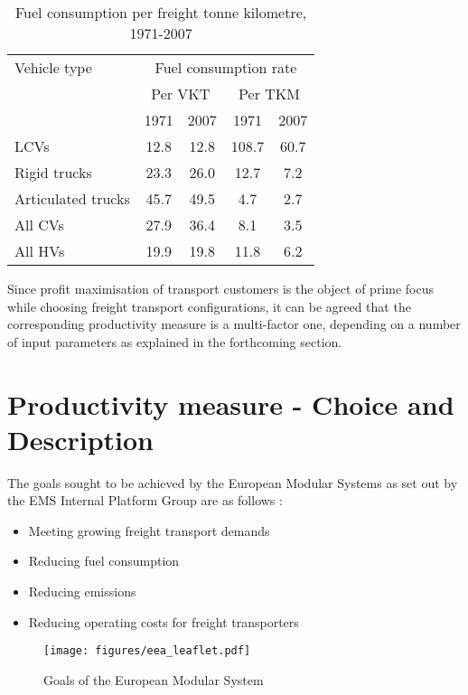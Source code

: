 \documentclass[ExampleMasters.tex]{subfiles}
\begin{document}
		\begin{table}[ht]
			\centering 
			\begin{tabular}{l c c c c}
  			\hline
			Vehicle type & \multicolumn{4}{c}{Fuel consumption rate}\\ \cline{2-3} \cline{4-5}
			\ & \multicolumn{2}{c}{Per VKT} & \multicolumn{2}{c}{Per TKM}\\ \cline{2-3} \cline{4-5}
			\ & 1971 & 2007 & 1971 & 2007\\ \hline
			    LCVs  & 12.8 & 12.8 & 108.7 & 60.7\\
			    Rigid trucks  & 23.3 & 26.0 & 12.7  & 7.2\\
			    Articulated trucks  & 45.7 & 49.5 & 4.7 & 2.7  \\
			    All CVs  & 27.9 & 36.4 & 8.1 & 3.5 \\
			    All HVs  & 19.9 & 19.8 & 11.8 & 6.2 \\
			\hline 
			\end{tabular}
			\caption{Fuel consumption per freight tonne kilometre, 1971-2007 \cite{TruckProdAus}} 
			\label{table:fuelConsumptionRate} 
		\end{table}

		Since profit maximisation of transport customers is the object of prime focus while choosing freight transport configurations, it can be agreed that the corresponding productivity measure is a multi-factor one, depending on a number of input parameters as explained in the forthcoming section.\\

	\pagebreak

	\section{Productivity measure - Choice and Description}

		The goals sought to be achieved by the European Modular Systems as set out by the EMS Internal Platform Group are as follows \cite{EMSleaflet}:
		\begin{itemize}
			\item Meeting growing freight transport demands
			\item Reducing fuel consumption
			\item Reducing emissions
			\item Reducing operating costs for freight transporters
		\end{itemize}

		\begin{figure}[h!]
			\centering
			\texttt{[image: figures/eea\_leaflet.pdf]}
			\caption{Goals of the European Modular System \cite{EMSleaflet}}
			\label{EMSleaflet}
		\end{figure}
\end{document}
